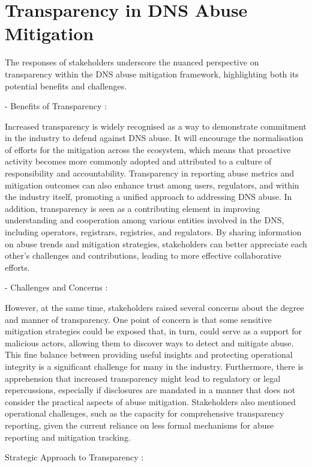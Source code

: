 \section{Transparency in DNS Abuse Mitigation} 

The responses of stakeholders underscore the nuanced perspective on transparency within the DNS abuse mitigation framework, highlighting both its potential benefits and challenges.

- Benefits of Transparency :

Increased transparency is widely recognised as a way to demonstrate commitment in the industry to defend against DNS abuse. It will encourage the normalisation of efforts for the mitigation across the ecosystem, which means that proactive activity becomes more commonly adopted and attributed to a culture of responsibility and accountability. Transparency in reporting abuse metrics and mitigation outcomes can also enhance trust among users, regulators, and within the industry itself, promoting a unified approach to addressing DNS abuse. In addition, transparency is seen as a contributing element in improving understanding and cooperation among various entities involved in the DNS, including operators, registrars, registries, and regulators. By sharing information on abuse trends and mitigation strategies, stakeholders can better appreciate each other's challenges and contributions, leading to more effective collaborative efforts.


- Challenges and Concerns :

However, at the same time, stakeholders raised several concerns about the degree and manner of transparency. One point of concern is that some sensitive mitigation strategies could be exposed that, in turn, could serve as a support for malicious actors, allowing them to discover ways to detect and mitigate abuse. This fine balance between providing useful insights and protecting operational integrity is a significant challenge for many in the industry. Furthermore, there is apprehension that increased transparency might lead to regulatory or legal repercussions, especially if disclosures are mandated in a manner that does not consider the practical aspects of abuse mitigation. Stakeholders also mentioned operational challenges, such as the capacity for comprehensive transparency reporting, given the current reliance on less formal mechanisms for abuse reporting and mitigation tracking.


Strategic Approach to Transparency :

